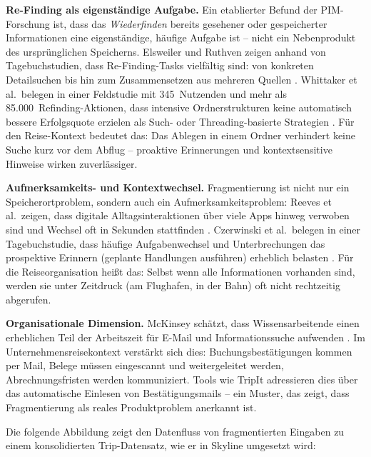\medskip\noindent\textbf{Re-Finding als eigenständige Aufgabe.}
Ein etablierter Befund der PIM-Forschung ist, dass das \textit{Wiederfinden}
bereits gesehener oder gespeicherter Informationen eine eigenständige,
häufige Aufgabe ist -- nicht ein Nebenprodukt des ursprünglichen Speicherns.
Elsweiler und Ruthven zeigen anhand von Tagebuchstudien, dass Re-Finding-Tasks
vielfältig sind: von konkreten Detailsuchen bis hin zum Zusammensetzen aus
mehreren Quellen \cite{elsweiler_ruthven2007_taskbased_pim}.
Whittaker et al.\ belegen in einer Feldstudie mit 345~Nutzenden und
mehr als 85.000~Refinding-Aktionen, dass intensive Ordnerstrukturen keine
automatisch bessere Erfolgsquote erzielen als Such- oder Threading-basierte
Strategien \cite{whittaker2011_email_refinding}. Für den Reise-Kontext
bedeutet das: Das Ablegen in einem Ordner verhindert keine Suche kurz vor
dem Abflug -- proaktive Erinnerungen und kontextsensitive Hinweise wirken
zuverlässiger.

\medskip\noindent\textbf{Aufmerksamkeits- und Kontextwechsel.}
Fragmentierung ist nicht nur ein Speicherortproblem, sondern auch ein
Aufmerksamkeitsproblem: Reeves et al.\ zeigen, dass digitale Alltagsinteraktionen
über viele Apps hinweg verwoben sind und Wechsel oft in Sekunden stattfinden
\cite{reeves2021_screenomics}. Czerwinski et al.\ belegen in einer Tagebuchstudie,
dass häufige Aufgabenwechsel und Unterbrechungen das prospektive Erinnern
(geplante Handlungen ausführen) erheblich belasten
\cite{czerwinski2004_task_switching_diary}. Für die Reiseorganisation heißt
das: Selbst wenn alle Informationen vorhanden sind, werden sie unter
Zeitdruck (am Flughafen, in der Bahn) oft nicht rechtzeitig abgerufen.

\medskip\noindent\textbf{Organisationale Dimension.}
McKinsey schätzt, dass Wissensarbeitende einen erheblichen Teil der
Arbeitszeit für E-Mail und Informationssuche aufwenden
\cite{mckinsey2012_social_media_productivity}. Im Unternehmensreisekontext
verstärkt sich dies: Buchungsbestätigungen kommen per Mail, Belege müssen
eingescannt und weitergeleitet werden, Abrechnungsfristen werden kommuniziert.
Tools wie TripIt adressieren dies über das automatische Einlesen von
Bestätigungsmails \cite{tripit_official_forward_emails} -- ein Muster, das
zeigt, dass Fragmentierung als reales Produktproblem anerkannt ist.

Die folgende Abbildung zeigt den Datenfluss von fragmentierten Eingaben
zu einem konsolidierten Trip-Datensatz, wie er in Skyline umgesetzt wird:

